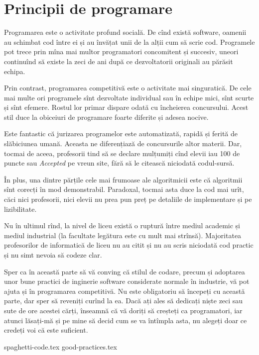 \part{Principii de programare}

Programarea este o activitate profund socială. De cînd există software, oamenii au schimbat cod între ei și au învățat unii de la alții cum să scrie cod. Programele pot trece prin mîna mai multor programatori concomitent și succesiv, uneori continuînd să existe la zeci de ani după ce dezvoltatorii originali au părăsit echipa.

Prin contrast, programarea competitivă este o activitate mai singuratică. De cele mai multe ori programele sînt dezvoltate individual sau în echipe mici, sînt scurte și sînt efemere. Rostul lor primar dispare odată cu încheierea concursului. Acest stil duce la obiceiuri de programare foarte diferite și adesea nocive.

Este fantastic că jurizarea programelor este automatizată, rapidă și ferită de slăbiciunea umană. Aceasta ne diferențiază de concursurile altor materii. Dar, tocmai de aceea, profesorii tind să se declare mulțumiți cînd elevii iau 100 de puncte sau \textit{Accepted} pe vreun site, fără să le citească niciodată codul-sursă.

În plus, una dintre părțile cele mai frumoase ale algoritmicii este că algoritmii sînt corecți în mod demonstrabil. Paradoxal, tocmai asta duce la cod mai urît, căci nici profesorii, nici elevii nu prea pun preț pe detaliile de implementare și pe lizibilitate.

Nu în ultimul rînd, la nivel de liceu există o ruptură între mediul academic și mediul industrial (la facultate legătura este cu mult mai strînsă). Majoritatea profesorilor de informatică de liceu nu au citit și nu au scris niciodată cod practic și nu simt nevoia să codeze clar.

Sper ca în această parte să vă conving că stilul de codare, precum și adoptarea unor bune practici de inginerie software considerate normale în industrie, vă pot ajuta și în programarea competitivă. Nu este obligatoriu să începeți cu această parte, dar sper să reveniți curînd la ea. Dacă ați ales să dedicați niște zeci sau sute de ore acestei cărți, înseamnă că vă doriți să creșteți ca programatori, iar atunci lăsați-mă și pe mine să decid cum se va întîmpla asta, nu alegeți doar ce credeți voi că este suficient. 

{spaghetti-code.tex}
{good-practices.tex}
